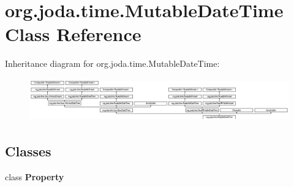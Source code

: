 \hypertarget{classorg_1_1joda_1_1time_1_1_mutable_date_time}{\section{org.\-joda.\-time.\-Mutable\-Date\-Time Class Reference}
\label{classorg_1_1joda_1_1time_1_1_mutable_date_time}
}
Inheritance diagram for org.\-joda.\-time.\-Mutable\-Date\-Time\-:\begin{figure}[H]
\begin{center}
\leavevmode
\includegraphics[height=1.850220cm]{classorg_1_1joda_1_1time_1_1_mutable_date_time}
\end{center}
\end{figure}
\subsection*{Classes}
\begin{DoxyCompactItemize}
\item 
class {\bfseries Property}
\end{DoxyCompactItemize}
